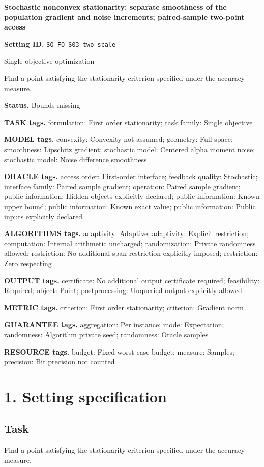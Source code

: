 \documentclass[10pt,a4paper]{article}
\begin{document}
\raggedright

{\LARGE\bfseries\sffamily\color{AtlasNavy} Stochastic nonconvex stationarity: separate smoothness of the population gradient and noise increments; paired-sample two-point access\par}\vspace{5pt}
\textbf{Setting ID.} \texttt{SO\_\allowbreak{}FO\_\allowbreak{}S03\_\allowbreak{}two\_\allowbreak{}scale}

Single-objective optimization

Find a point satisfying the stationarity criterion specified under the accuracy measure.

\textbf{Status.} Bounds missing

\textbf{TASK tags.} formulation: First order stationarity; task family: Single objective

\textbf{MODEL tags.} convexity: Convexity not assumed; geometry: Full space; smoothness: Lipschitz gradient; stochastic model: Centered alpha moment noise; stochastic model: Noise difference smoothness

\textbf{ORACLE tags.} access order: First-order interface; feedback quality: Stochastic; interface family: Paired sample gradient; operation: Paired sample gradient; public information: Hidden objects explicitly declared; public information: Known upper bound; public information: Known exact value; public information: Public inputs explicitly declared

\textbf{ALGORITHMS tags.} adaptivity: Adaptive; adaptivity: Explicit restriction; computation: Internal arithmetic uncharged; randomization: Private randomness allowed; restriction: No additional span restriction explicitly imposed; restriction: Zero respecting

\textbf{OUTPUT tags.} certificate: No additional output certificate required; feasibility: Required; object: Point; postprocessing: Unqueried output explicitly allowed

\textbf{METRIC tags.} criterion: First order stationarity; criterion: Gradient norm

\textbf{GUARANTEE tags.} aggregation: Per instance; mode: Expectation; randomness: Algorithm private seed; randomness: Oracle samples

\textbf{RESOURCE tags.} budget: Fixed worst-case budget; measure: Samples; precision: Bit precision not counted

\section{1. Setting specification}
\subsection{Task}
Find a point satisfying the stationarity criterion specified under the accuracy measure.
\end{document}
